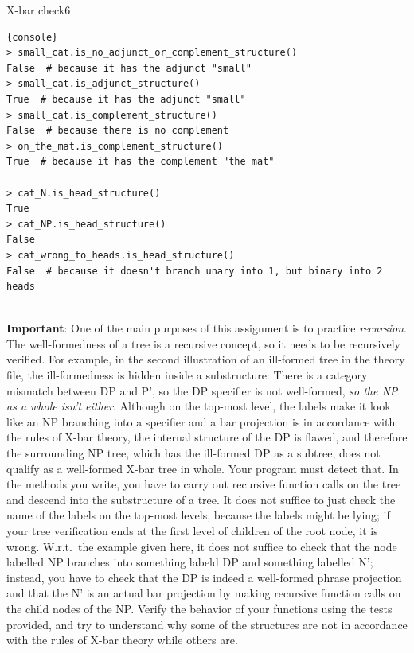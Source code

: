 \begin{task}{X-bar check}{6}
\begin{lstlisting}{console}
> small_cat.is_no_adjunct_or_complement_structure()
False  # because it has the adjunct "small"
> small_cat.is_adjunct_structure()
True  # because it has the adjunct "small"
> small_cat.is_complement_structure()
False  # because there is no complement
> on_the_mat.is_complement_structure()
True  # because it has the complement "the mat"

> cat_N.is_head_structure()
True
> cat_NP.is_head_structure()
False
> cat_wrong_to_heads.is_head_structure()
False  # because it doesn't branch unary into 1, but binary into 2 heads


\end{lstlisting}

\medskip

\textbf{Important}: One of the main purposes of this assignment is to practice \textit{recursion}. The well-formedness of a tree is a recursive concept, so it needs to be recursively verified. For example, in the second illustration of an ill-formed tree in the theory file, the ill-formedness is hidden inside a substructure: There is a category mismatch between DP and P', so the DP specifier is not well-formed, \textit{so the NP as a whole isn't either}. Although on the top-most level, the labels make it look like an NP branching into a specifier and a bar projection is in accordance with the rules of X-bar theory, the internal structure of the DP is flawed, and therefore the surrounding NP tree, which has the ill-formed DP as a subtree, does not qualify as a well-formed X-bar tree in whole. Your program must detect that. In the methods you write, you have to carry out recursive function calls on the tree and descend into the substructure of a tree. It does not suffice to just check the name of the labels on the top-most levels, because the labels might be lying; if your tree verification ends at the first level of children of the root node, it is wrong. W.r.t.\ the example given here, it does not suffice to check that the node labelled NP branches into something labeld DP and something labelled N'; instead, you have to check that the DP is indeed a well-formed phrase projection and that the N' is an actual bar projection by making recursive function calls on the child nodes of the NP. Verify the behavior of your functions using the tests provided, and try to understand why some of the structures are not in accordance with the rules of X-bar theory while others are.\\


\end{task}
